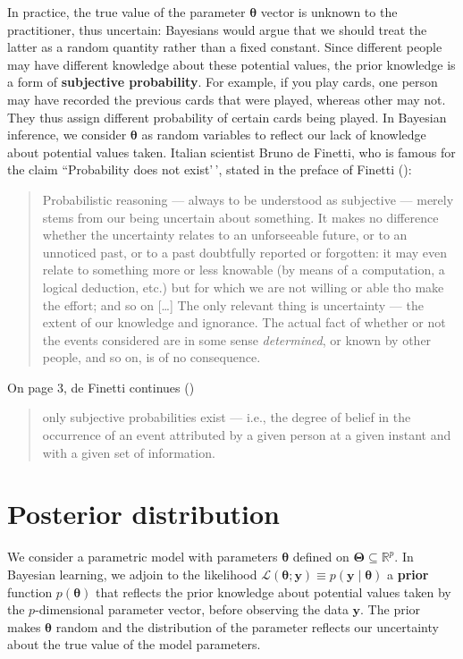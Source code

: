 \documentclass[
  11pt,
  letterpaper,
]{scrbook}
\theoremstyle{definition}
\theoremstyle{plain}
\theoremstyle{plain}
\theoremstyle{definition}
\theoremstyle{definition}
\theoremstyle{remark}
\begin{document}
In practice, the true value of the parameter \(\boldsymbol{\theta}\)
vector is unknown to the practitioner, thus uncertain: Bayesians would
argue that we should treat the latter as a random quantity rather than a
fixed constant. Since different people may have different knowledge
about these potential values, the prior knowledge is a form of
\textbf{subjective probability}. For example, if you play cards, one
person may have recorded the previous cards that were played, whereas
other may not. They thus assign different probability of certain cards
being played. In Bayesian inference, we consider \(\boldsymbol{\theta}\)
as random variables to reflect our lack of knowledge about potential
values taken. Italian scientist Bruno de Finetti, who is famous for the
claim ``Probability does not exist'\,', stated in the preface of Finetti
():

\begin{quote}
Probabilistic reasoning --- always to be understood as subjective ---
merely stems from our being uncertain about something. It makes no
difference whether the uncertainty relates to an unforseeable future, or
to an unnoticed past, or to a past doubtfully reported or forgotten: it
may even relate to something more or less knowable (by means of a
computation, a logical deduction, etc.) but for which we are not willing
or able tho make the effort; and so on {[}\ldots{]} The only relevant
thing is uncertainty --- the extent of our knowledge and ignorance. The
actual fact of whether or not the events considered are in some sense
\emph{determined}, or known by other people, and so on, is of no
consequence.
\end{quote}

On page 3, de Finetti continues ()

\begin{quote}
only subjective probabilities exist --- i.e., the degree of belief in
the occurrence of an event attributed by a given person at a given
instant and with a given set of information.
\end{quote}

\section{Posterior distribution}\label{posterior-distribution}

We consider a parametric model with parameters \(\boldsymbol{\theta}\)
defined on \(\boldsymbol{\Theta} \subseteq \mathbb{R}^p\). In Bayesian
learning, we adjoin to the likelihood
\(\mathcal{L}(\boldsymbol{\theta}; \boldsymbol{y}) \equiv p(\boldsymbol{y} \mid \boldsymbol{\theta})\)
a \textbf{prior} function \(p(\boldsymbol{\theta})\) that reflects the
prior knowledge about potential values taken by the \(p\)-dimensional
parameter vector, before observing the data \(\boldsymbol{y}\). The
prior makes \(\boldsymbol{\theta}\) random and the distribution of the
parameter reflects our uncertainty about the true value of the model
parameters.
\end{document}

